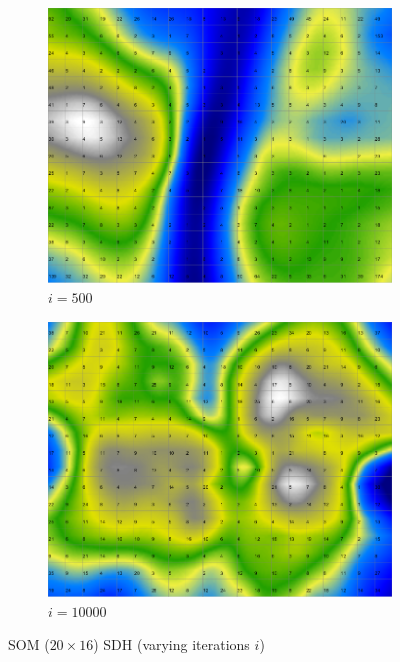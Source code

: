 \documentclass{acm_proc_article-sp}
\begin{document}
\begin{figure}
\begin{subfigure}[b]{0.24\linewidth}
    \end{subfigure}
    \begin{subfigure}[b]{0.24\linewidth}
        \includegraphics[width=\linewidth]{img/wine-newmid-smoothed-data-histogram-i-500}
        \caption{$i=500$}
        \label{fig:wine-newmid-smoothed-data-histogram-i-500}
    \end{subfigure}
    \begin{subfigure}[b]{0.24\linewidth}
        \includegraphics[width=\linewidth]{img/wine-newmid-smoothed-data-histogram-i-10000}
        \caption{$i=10000$}
        \label{fig:wine-newmid-smoothed-data-histogram-i-10000}
    \end{subfigure}
    \caption{SOM ($20\times16$) SDH (varying iterations $i$)}
    \label{fig:wine-newmid-smoothed-data-histogram-i}
\end{figure}
\end{document}
